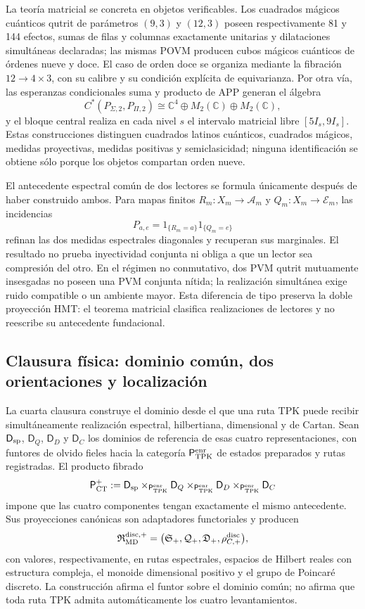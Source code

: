 La teoría matricial se concreta en objetos verificables. Los cuadrados mágicos
cuánticos qutrit de parámetros \((9,3)\) y \((12,3)\) poseen respectivamente
81 y 144 efectos, sumas de filas y columnas exactamente unitarias y
dilataciones simultáneas declaradas; las mismas POVM producen cubos mágicos
cuánticos de órdenes nueve y doce. El caso de orden doce se organiza mediante
la fibración \(12\to4\times3\), con su calibre y su condición explícita de
equivarianza. Por otra vía, las esperanzas condicionales suma y producto de APP
generan el álgebra
\[
 C^*(P_{\Sigma,2},P_{\Pi,2})
 \cong\mathbb C^4\oplus M_2(\mathbb C)\oplus M_2(\mathbb C),
\]
y el bloque central realiza en cada nivel \(s\) el intervalo matricial libre
\([5I_s,9I_s]\). Estas construcciones distinguen cuadrados latinos cuánticos,
cuadrados mágicos, medidas proyectivas, medidas positivas y semiclasicidad;
ninguna identificación se obtiene sólo porque los objetos compartan orden
nueve.

El antecedente espectral común de dos lectores se formula únicamente después
de haber construido ambos. Para mapas finitos
\(R_m:X_m\to\mathcal A_m\) y \(Q_m:X_m\to\mathcal E_m\), las incidencias
\[
 P_{a,e}=1_{\{R_m=a\}}1_{\{Q_m=e\}}
\]
refinan las dos medidas espectrales diagonales y recuperan sus marginales. El
resultado no prueba inyectividad conjunta ni obliga a que un lector sea
compresión del otro. En el régimen no conmutativo, dos PVM qutrit mutuamente
insesgadas no poseen una PVM conjunta nítida; la realización simultánea exige
ruido compatible o un ambiente mayor. Esta diferencia de tipo preserva la
doble proyección HMT: el teorema matricial clasifica realizaciones de lectores
y no reescribe su antecedente fundacional.

\subsection*{Clausura física: dominio común, dos orientaciones y localización}

La cuarta clausura construye el dominio desde el que una ruta TPK puede recibir
simultáneamente realización espectral, hilbertiana, dimensional y de Cartan.
Sean \(\mathsf D_{\rm sp}\), \(\mathsf D_Q\), \(\mathsf D_D\) y
\(\mathsf D_C\) los dominios de referencia de esas cuatro representaciones, con
funtores de olvido fieles hacia la categoría
\(\mathsf P_{\rm TPK}^{\rm enr}\) de estados preparados y rutas registradas.
El producto fibrado
\[
 \mathsf P_{\rm CT}^{+}
 :=\mathsf D_{\rm sp}
 \times_{\mathsf P_{\rm TPK}^{\rm enr}}\mathsf D_Q
 \times_{\mathsf P_{\rm TPK}^{\rm enr}}\mathsf D_D
 \times_{\mathsf P_{\rm TPK}^{\rm enr}}\mathsf D_C
\]
impone que las cuatro componentes tengan exactamente el mismo antecedente.
Sus proyecciones canónicas son adaptadores functoriales y producen
\[
 \mathfrak R_{\rm MD}^{\rm disc,+}
 =\bigl(\mathfrak S_+,\mathcal Q_+,\mathfrak D_+,
        \rho_{C,+}^{\rm disc}\bigr),
\]
con valores, respectivamente, en rutas espectrales, espacios de Hilbert reales
con estructura compleja, el monoide dimensional positivo y el grupo de
Poincaré discreto. La construcción afirma el funtor sobre el dominio común; no
afirma que toda ruta TPK admita automáticamente los cuatro levantamientos.

